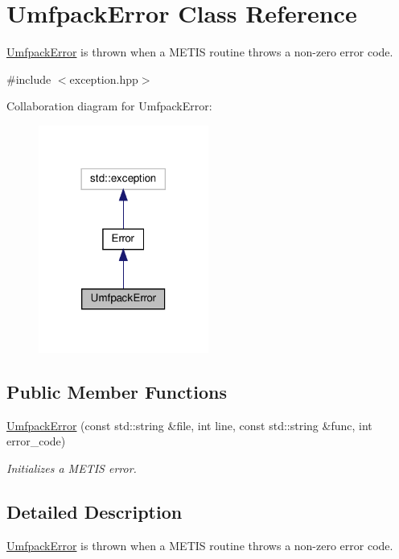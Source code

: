 \hypertarget{classUmfpackError}{}\section{Umfpack\+Error Class Reference}
\label{classUmfpackError}


\hyperlink{classUmfpackError}{Umfpack\+Error} is thrown when a M\+E\+T\+IS routine throws a non-\/zero error code.  




{\ttfamily \#include $<$exception.\+hpp$>$}



Collaboration diagram for Umfpack\+Error\+:
\nopagebreak
\begin{figure}[H]
\begin{center}
\leavevmode
\includegraphics[width=158pt]{classUmfpackError__coll__graph}
\end{center}
\end{figure}
\subsection*{Public Member Functions}
\begin{DoxyCompactItemize}
\item 
\hyperlink{classUmfpackError_a3df702dc59370f9ff8f097f8657d3fff}{Umfpack\+Error} (const std\+::string \&file, int line, const std\+::string \&func, int error\+\_\+code)
\begin{DoxyCompactList}\small\item\em Initializes a M\+E\+T\+IS error. \end{DoxyCompactList}\end{DoxyCompactItemize}


\subsection{Detailed Description}
\hyperlink{classUmfpackError}{Umfpack\+Error} is thrown when a M\+E\+T\+IS routine throws a non-\/zero error code. 

